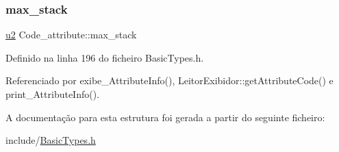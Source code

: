 \mbox{\label{structCode__attribute_a300885ff1326f01f7c86e7b4425f0d35}} 
\subsubsection{\texorpdfstring{max\+\_\+stack}{max\_stack}}
{\footnotesize\ttfamily \hyperlink{BasicTypes_8h_a732cde1300aafb73b0ea6c2558a7a54f}{u2} Code\+\_\+attribute\+::max\+\_\+stack}



Definido na linha 196 do ficheiro Basic\+Types.\+h.



Referenciado por exibe\+\_\+\+Attribute\+Info(), Leitor\+Exibidor\+::get\+Attribute\+Code() e print\+\_\+\+Attribute\+Info().



A documentação para esta estrutura foi gerada a partir do seguinte ficheiro\+:\begin{DoxyCompactItemize}
\item 
include/\hyperlink{BasicTypes_8h}{Basic\+Types.\+h}\end{DoxyCompactItemize}
